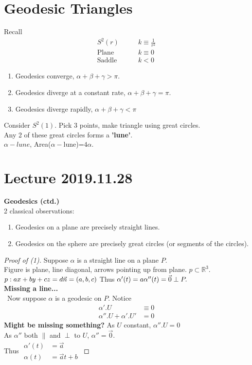 \documentclass{article}
\newcommand{\R}{\mathbb{R}}
\theoremstyle{definition}
\theoremstyle{remark}
\theoremstyle{example}
\begin{document}
	\section*{Geodesic Triangles}
	Recall \begin{align}
		S^2(r) & \qquad k \equiv \frac{1}{r^2}\\
		\mathrm{Plane} & \qquad k \equiv 0\\
		\mathrm{Saddle} & \qquad k < 0
	\end{align}
	\begin{enumerate}
		\item Geodesics converge, $\alpha+\beta+\gamma>\pi$.
		\item Geodesics diverge at a constant rate, $\alpha+\beta+\gamma=\pi$.
		\item Geodesics diverge rapidly, $\alpha+\beta+\gamma<\pi$
	\end{enumerate}
	Consider $S^2(1)$. Pick 3 points, make triangle using great circles.\\
	Any 2 of these great circles forms a \textbf{'lune'}.\\
	$\alpha-lune$, Area($\alpha-$lune)=$4 \alpha$.
	
	\section*{Lecture 2019.11.28}
	\textbf{Geodesics (ctd.)}\\
	2 classical observations:
	\begin{enumerate}
		\item Geodesics on a plane are precisely straight lines.
		\item Geodesics on the sphere are precisely great circles (or segments of the circles).
	\end{enumerate}

	\begin{proof}[Proof of (1)]
		Suppose $\alpha$ is a straight line on a plane $P$.\\
		Figure is plane, line diagonal, arrows pointing up from plane. $p \subset \R^3$.\\
		$p:ax+by+cz=d\\
		\vec{n}=(a,b,c)$
		Thus $\alpha'(t)=a\\
		\alpha''(t)=\vec{0} \perp P.$\\
		\textbf{Missing a line...}\\\
		Now suppose $\alpha$ is a geodesic on $P$. Notice \qquad \begin{align*}
			\alpha'.U&\equiv 0\\
			\alpha''.U+\alpha'.U'&=0
		\end{align*}
		\textbf{Might be missing something?}
		As $U$ constant, $\alpha''.U=0$\\
		As $\alpha''$ both $\parallel$ and $\perp$ to $U$, $\alpha''=\vec{0}$.\\
		Thus $\begin{aligned}
			\alpha'(t)&=\vec{a}\\
			\alpha(t)&=\vec{a}t+b
		\end{aligned}$
	\end{proof}
\end{document}
